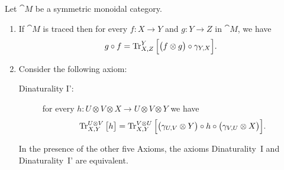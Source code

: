 \begin{proposition}\label{prop:dinaturality}\mbox{}
Let $\cat{M}$ be a symmetric monoidal category.
\begin{enumerate}
 \item If $\cat{M}$ is traced then for every $f:X\to Y$ and $g:Y\to Z$ in $\cat{M}$, we have
 \[g\circ f=\operatorname{Tr}^Y_{X,Z}\Big[\big(f\otimes g\big)\circ\gamma_{Y,X}\Big].\]
 \item Consider the following axiom:
 \begin{description}
  \item [Dinaturality I':] for every $h:U\otimes V\otimes X\to U\otimes V\otimes Y$ we have
 \[\operatorname{Tr}^{U\otimes V}_{X,Y}\big[h\big]=\operatorname{Tr}^{V\otimes U}_{X,Y}\Big[\big(\gamma_{U,V}\otimes Y\big)\circ h\circ\big(\gamma_{V,U}\otimes X\big)\Big].\]
 \end{description}
 In the presence of the other five Axioms, the axioms Dinaturality~I and Dinaturality~I' are equivalent.
\end{enumerate}
\end{proposition}
